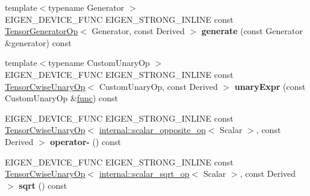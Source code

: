 \begin{DoxyCompactItemize}
\item 
\mbox{\label{class_eigen_1_1_tensor_base_3_01_derived_00_01_read_only_accessors_01_4_a3c34a78ef543cf60dc7b05a48b7794b7}} 
{\footnotesize template$<$typename Generator $>$ }\\E\+I\+G\+E\+N\+\_\+\+D\+E\+V\+I\+C\+E\+\_\+\+F\+U\+NC E\+I\+G\+E\+N\+\_\+\+S\+T\+R\+O\+N\+G\+\_\+\+I\+N\+L\+I\+NE const \hyperlink{class_eigen_1_1_tensor_generator_op}{Tensor\+Generator\+Op}$<$ Generator, const Derived $>$ {\bfseries generate} (const Generator \&generator) const
\item 
\mbox{\label{class_eigen_1_1_tensor_base_3_01_derived_00_01_read_only_accessors_01_4_a6c0fb6695ba9a6d9400242d2de6bd334}} 
{\footnotesize template$<$typename Custom\+Unary\+Op $>$ }\\E\+I\+G\+E\+N\+\_\+\+D\+E\+V\+I\+C\+E\+\_\+\+F\+U\+NC E\+I\+G\+E\+N\+\_\+\+S\+T\+R\+O\+N\+G\+\_\+\+I\+N\+L\+I\+NE const \hyperlink{class_eigen_1_1_tensor_cwise_unary_op}{Tensor\+Cwise\+Unary\+Op}$<$ Custom\+Unary\+Op, const Derived $>$ {\bfseries unary\+Expr} (const Custom\+Unary\+Op \&\hyperlink{structfunc}{func}) const
\item 
\mbox{\label{class_eigen_1_1_tensor_base_3_01_derived_00_01_read_only_accessors_01_4_a156244eba84cb75e44877297d609bfd0}} 
E\+I\+G\+E\+N\+\_\+\+D\+E\+V\+I\+C\+E\+\_\+\+F\+U\+NC E\+I\+G\+E\+N\+\_\+\+S\+T\+R\+O\+N\+G\+\_\+\+I\+N\+L\+I\+NE const \hyperlink{class_eigen_1_1_tensor_cwise_unary_op}{Tensor\+Cwise\+Unary\+Op}$<$ \hyperlink{struct_eigen_1_1internal_1_1scalar__opposite__op}{internal\+::scalar\+\_\+opposite\+\_\+op}$<$ Scalar $>$, const Derived $>$ {\bfseries operator-\/} () const
\item 
\mbox{\label{class_eigen_1_1_tensor_base_3_01_derived_00_01_read_only_accessors_01_4_a26a99144d3162a4569847519acfc5ab9}} 
E\+I\+G\+E\+N\+\_\+\+D\+E\+V\+I\+C\+E\+\_\+\+F\+U\+NC E\+I\+G\+E\+N\+\_\+\+S\+T\+R\+O\+N\+G\+\_\+\+I\+N\+L\+I\+NE const \hyperlink{class_eigen_1_1_tensor_cwise_unary_op}{Tensor\+Cwise\+Unary\+Op}$<$ \hyperlink{struct_eigen_1_1internal_1_1scalar__sqrt__op}{internal\+::scalar\+\_\+sqrt\+\_\+op}$<$ Scalar $>$, const Derived $>$ {\bfseries sqrt} () const

\end{DoxyCompactItemize}
